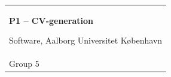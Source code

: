 %
\begin{titlepage}
\vspace*{\fill}
  \noindent%
  {\color{white}\colorbox{aaublue}{\begin{tabular}{@{}p{\textwidth}@{}}
    \begin{center}
    \Huge{\textbf{%
      P1 -- CV-generation
    }}
    \end{center}
    \begin{center}
      \Large{%
        Software, Aalborg Universitet København
      }
    \end{center}
    \vspace{0.2cm}
   \begin{center}
    {\Large%
      Hans~Erik~Heje, Mikkel~Kaa, David~Doctor~Heyde~Rasmussen, Ming~Hui~Sun \& Kristoffer~Bach~Wilhjelm
    }\\
    \vspace{0.2cm}
    {\large%
      Group 5
    }
   \end{center}
   \vspace{0.2cm}


\end{tabular}}}
\end{titlepage}
